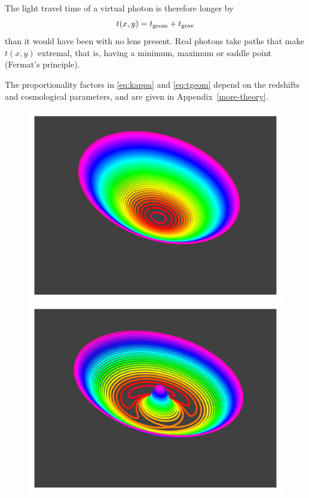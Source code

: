 \documentclass[usenatbib]{mn2e}
\begin{document}
The light travel time of a virtual photon is therefore longer by
\begin{equation}  \label{eq:tarriv}
t(x,y) = t_{\rm geom} + t_{\rm grav}
\end{equation}
than it would have been with no lens present.  Real photons take paths
that make $t(x,y)$ extremal, that is, having a minimum, maximum or
saddle point (Fermat's principle).

The proportionality factors in \eqref{eq:kappa} and \eqref{eq:tgeom}
depend on the redshifts and cosmological parameters, and are given in
Appendix~\ref{more-theory}.

\begin{figure}
\centering
\includegraphics[width=0.95\columnwidth]{fig/arriv_0}
\includegraphics[width=0.95\columnwidth]{fig/arriv_1}

\end{figure}
\end{document}
